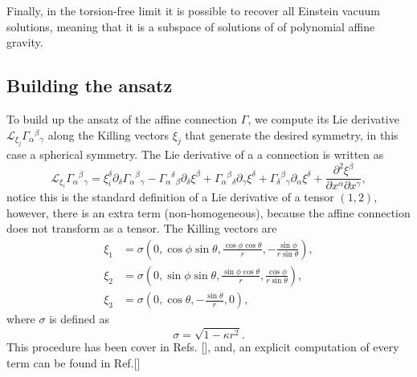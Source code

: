 \documentclass{article}
\providecommand{\ctG}[3]{\Gamma_{#1}{}^{ #2}{}_{#3}}
\begin{document}
Finally, in the torsion-free limit it is possible to recover all Einstein vacuum solutions,
meaning that it is a subspace of solutions of of polynomial affine gravity.

\subsection{Building the ansatz}

To build up the ansatz of the affine connection $\Gamma$, we compute its Lie derivative 
$\mathcal{L}_{\xi_j}\ctG{\alpha}{\beta}{\gamma}$ along the Killing vectors $\xi_j$ that 
generate the desired symmetry, in this case a spherical symmetry. The Lie derivative
of a a connection is written as
\begin{equation}
    \mathcal{L}_{\xi_i}\ctG{\alpha}{\beta}{\gamma} = \xi_i^\delta\partial_\delta \ctG{\alpha}{\beta}{\gamma}
    -\ctG{\alpha}{\delta}{\beta}\partial_\delta\xi^\beta + \ctG{\alpha}{\beta}{\delta}\partial_\gamma \xi^\delta
    + \ctG{\delta}{\beta}{\gamma}\partial_\alpha \xi^\delta + \frac{\partial^2 \xi ^\beta}{\partial x^\alpha \partial x^\gamma},
\end{equation}
notice this is the standard definition of a Lie derivative of a tensor $(1,2)$, however, 
there is an extra term (non-homogeneous), because the affine connection does not transform
as a tensor. The Killing vectors are
\begin{align}
    \xi_1 & = \sigma\left(0, \cos\phi\sin\theta, \frac{\cos\phi\cos\theta}{r}, -\frac{\sin\phi}{r\sin\theta}\right),\\
    \xi_2 & = \sigma\left(0, \sin\phi\sin\theta, \frac{\sin\phi\cos\theta}{r}, \frac{\cos\phi}{r\sin\theta}\right),\\
    \xi_3 & = \sigma\left(0 , \cos\theta, -\frac{\sin\theta}{r}, 0\right),
\end{align}
where $\sigma$ is defined as 
\begin{equation}
    \sigma = \sqrt{1 - \kappa r^2}.
\end{equation}
This procedure has been cover in Refs. [], and, an explicit computation
of every term can be found in Ref.[]
\end{document}
